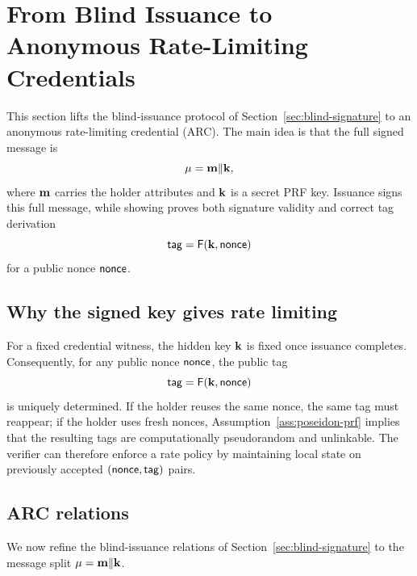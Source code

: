 \section{From Blind Issuance to Anonymous Rate-Limiting Credentials}
\label{sec:arc-construction}

This section lifts the blind-issuance protocol of Section~\ref{sec:blind-signature} to an anonymous
rate-limiting credential (ARC).  The main idea is that the full signed message is
\[
  \mathbf{\mu}=\mathbf{m}\Vert\mathbf{k},
\]
where $\mathbf{m}$ carries the holder attributes and $\mathbf{k}$ is a secret PRF key.  Issuance signs this full
message, while showing proves both signature validity and correct tag derivation
\[
  \mathsf{tag}=\mathsf{F}(\mathbf{k},\mathsf{nonce})
\]
for a public nonce $\mathsf{nonce}$.

\subsection{Why the signed key gives rate limiting}
For a fixed credential witness, the hidden key $\mathbf{k}$ is fixed once issuance completes.  Consequently, for any
public nonce $\mathsf{nonce}$, the public tag
\[
  \mathsf{tag}=\mathsf{F}(\mathbf{k},\mathsf{nonce})
\]
is uniquely determined.  If the holder reuses the same nonce, the same tag must reappear; if the holder uses
fresh nonces, Assumption~\ref{ass:poseidon-prf} implies that the resulting tags are computationally
pseudorandom and unlinkable.  The verifier can therefore enforce a rate policy by maintaining local state on
previously accepted $(\mathsf{nonce},\mathsf{tag})$ pairs.

\subsection{ARC relations}
We now refine the blind-issuance relations of Section~\ref{sec:blind-signature} to the message split
$\mathbf{\mu}=\mathbf{m}\Vert\mathbf{k}$.

